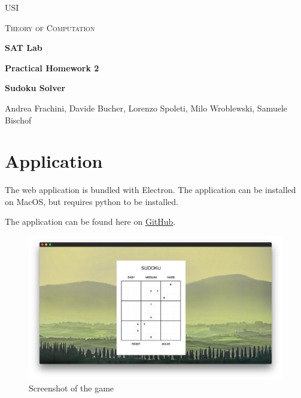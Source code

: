 \documentclass[10pt]{article}
\begin{document}
\begin{titlepage}
	\centering
  {\scshape\Large USI\par}
	{\scshape\Large Theory of Computation\par}
	\vspace{4.5cm}
  {\huge\bfseries SAT Lab\par}\vspace{0.5cm}
	{\large\bfseries Practical Homework 2\par}
  \vspace{2.5cm}
  {\Large\bfseries Sudoku Solver\par}\vspace{0.5cm}
	\vspace{6cm}
	{\Large Andrea Frachini, Davide Bucher, Lorenzo Spoleti, Milo Wroblewski, Samuele Bischof\par}

\end{titlepage}

\section*{Application}
The web application is bundled with Electron.
The application can be installed on MacOS, but requires python
to be installed.\par\vspace{0.5cm}
The application can be found here on \href{https://github.com/samuelebischof-ch/sudoku-sat}{GitHub}.

\begin{figure}[h!]
  \centering
  \includegraphics[width=\textwidth]{sudoku.png}
  \caption{Screenshot of the game}
\end{figure}
\par\vspace{1cm}
\end{document}
